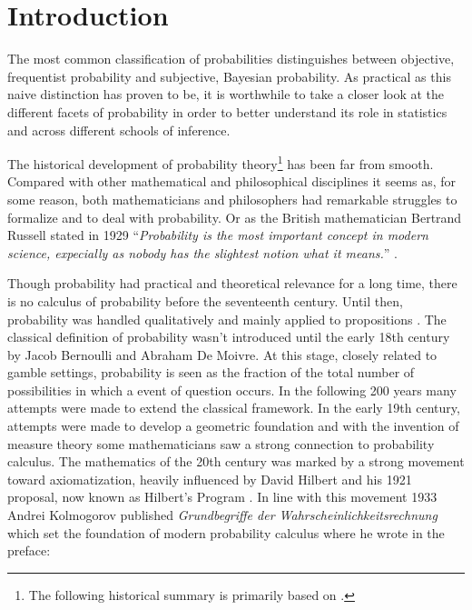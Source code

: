\documentclass[
]{report}
\author{}
\date{}
\theoremstyle{definition}
\renewcommand*\contentsname{Table of contents}
\newcommand\contentsname{Table of contents}
\begin{document}
\renewcommand{\contentsname}{Contents}
\tableofcontents
{}

\newpage

\section{Introduction}

The most common classification of probabilities distinguishes between
objective, frequentist probability and subjective, Bayesian probability.
As practical as this naive distinction has proven to be, it is
worthwhile to take a closer look at the different facets of probability
in order to better understand its role in statistics and across
different schools of inference.

The historical development of probability
theory\footnote{The following historical summary is primarily based on \cite{shafer_origins_2018}.}
has been far from smooth. Compared with other mathematical and
philosophical disciplines it seems as, for some reason, both
mathematicians and philosophers had remarkable struggles to formalize
and to deal with probability. Or as the British mathematician Bertrand
Russell stated in 1929
``\textit{Probability is the most important concept in modern science, expecially as nobody has the slightest notion what it means.}''
\cite{sep-probability-interpret}.

Though probability had practical and theoretical relevance for a long
time, there is no calculus of probability before the seventeenth
century. Until then, probability was handled qualitatively and mainly
applied to propositions \cite{sep-probability-interpret}. The classical
definition of probability wasn't introduced until the early 18th century
by Jacob Bernoulli and Abraham De Moivre. At this stage, closely related
to gamble settings, probability is seen as the fraction of the total
number of possibilities in which a event of question occurs. In the
following 200 years many attempts were made to extend the classical
framework. In the early 19th century, attempts were made to develop a
geometric foundation and with the invention of measure theory some
mathematicians saw a strong connection to probability calculus. The
mathematics of the 20th century was marked by a strong movement toward
axiomatization, heavily influenced by David Hilbert and his 1921
proposal, now known as Hilbert's Program \cite{sep-hilbert-program}. In
line with this movement 1933 Andrei Kolmogorov published
\textit{Grundbegriffe der Wahrscheinlichkeitsrechnung} which set the
foundation of modern probability calculus where he wrote in the preface:
\end{document}
